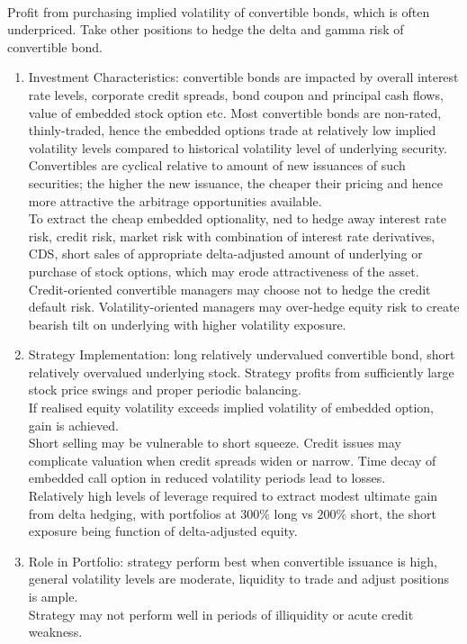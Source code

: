 \begin{remark} \\
Profit from purchasing implied volatility of convertible bonds, which is often underpriced. Take other positions to hedge the delta and gamma risk of convertible bond.
\begin{enumerate}[label=\roman*.]
\setlength{\itemsep}{0pt}
\item Investment Characteristics: convertible bonds are impacted by overall interest rate levels, corporate credit spreads, bond coupon and principal cash flows, value of embedded stock option etc. Most convertible bonds are non-rated, thinly-traded, hence the embedded options trade at relatively low implied volatility levels compared to historical volatility level of underlying security. Convertibles are cyclical relative to amount of new issuances of such securities; the higher the new issuance, the cheaper their pricing and hence more attractive the arbitrage opportunities available.\\
To extract the cheap embedded optionality, ned to hedge away interest rate risk, credit risk, market risk with combination of interest rate derivatives, CDS, short sales of appropriate delta-adjusted amount of underlying or purchase of stock options, which may erode attractiveness of the asset.\\
Credit-oriented convertible managers may choose not to hedge the credit default risk. Volatility-oriented managers may over-hedge equity risk to create bearish tilt on underlying with higher volatility exposure.
\item Strategy Implementation: long relatively undervalued convertible bond, short relatively overvalued underlying stock. Strategy profits from sufficiently large stock price swings and proper periodic balancing.\\
If realised equity volatility exceeds implied volatility of embedded option, gain is achieved.\\
Short selling may be vulnerable to short squeeze. Credit issues may complicate valuation when credit spreads widen or narrow. Time decay of embedded call option in reduced volatility periods lead to losses.\\
Relatively high levels of leverage required to extract modest ultimate gain from delta hedging, with portfolios at $300\%$ long vs $200\%$ short, the short exposure being function of delta-adjusted equity.
\item Role in Portfolio: strategy perform best when convertible issuance is high, general volatility levels are moderate, liquidity to trade and adjust positions is ample.\\
Strategy may not perform well in periods of illiquidity or acute credit weakness.
\end{enumerate}
\end{remark}

